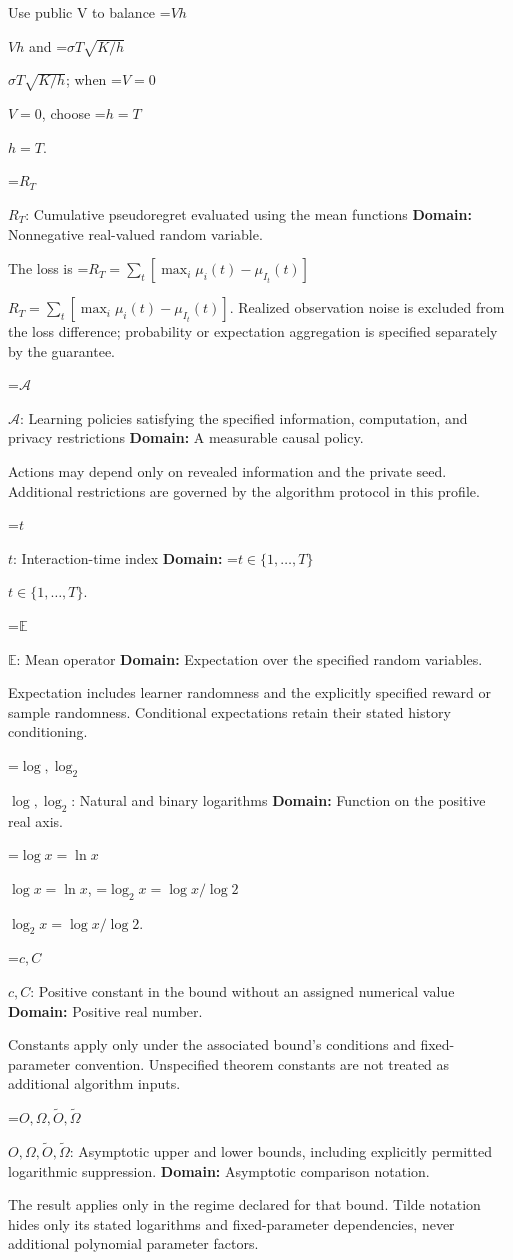 \documentclass[10pt,a4paper]{article}
\newcommand{\AtlasMath}[1]{\par\begingroup\centering\setbox0=\hbox{$\displaystyle #1$}\ifdim\wd0>1.4\linewidth\typeout{ATLAS WIDE FORMULA: \the\wd0}\fi\ifdim\wd0>\linewidth\resizebox{\linewidth}{!}{\box0}\else\box0\fi\par\endgroup}
\newcommand{\AtlasInlineMath}[1]{\begingroup\setbox0=\hbox{$#1$}\ifdim\wd0>.4\linewidth\endgroup\AtlasMath{#1}\else\endgroup$#1$\fi}
\begin{document}
Use public V to balance \AtlasInlineMath{Vh} and \AtlasInlineMath{\sigma T\sqrt{K/h}}; when \AtlasInlineMath{V=0}, choose \AtlasInlineMath{h=T}.

\AtlasInlineMath{R_T}: Cumulative pseudoregret evaluated using the mean functions \textbf{Domain:} Nonnegative real-valued random variable.

The loss is \AtlasInlineMath{R_T=\sum_t[\max_i\mu_i(t)-\mu_{I_t}(t)]}. Realized observation noise is excluded from the loss difference; probability or expectation aggregation is specified separately by the guarantee.

\AtlasInlineMath{\mathcal A}: Learning policies satisfying the specified information, computation, and privacy restrictions \textbf{Domain:} A measurable causal policy.

Actions may depend only on revealed information and the private seed. Additional restrictions are governed by the algorithm protocol in this profile.

\AtlasInlineMath{t}: Interaction-time index \textbf{Domain:} \AtlasInlineMath{t\in\{1,\ldots,T\}}.

\AtlasInlineMath{\mathbb E}: Mean operator \textbf{Domain:} Expectation over the specified random variables.

Expectation includes learner randomness and the explicitly specified reward or sample randomness. Conditional expectations retain their stated history conditioning.

\AtlasInlineMath{\log,\log_2}: Natural and binary logarithms \textbf{Domain:} Function on the positive real axis.

\AtlasInlineMath{\log x=\ln x}, \AtlasInlineMath{\log_2x=\log x/\log2}.

\AtlasInlineMath{c,C}: Positive constant in the bound without an assigned numerical value \textbf{Domain:} Positive real number.

Constants apply only under the associated bound’s conditions and fixed-parameter convention. Unspecified theorem constants are not treated as additional algorithm inputs.

\AtlasInlineMath{O,\Omega,\widetilde O,\widetilde\Omega}: Asymptotic upper and lower bounds, including explicitly permitted logarithmic suppression. \textbf{Domain:} Asymptotic comparison notation.

The result applies only in the regime declared for that bound. Tilde notation hides only its stated logarithms and fixed-parameter dependencies, never additional polynomial parameter factors.
\end{document}
